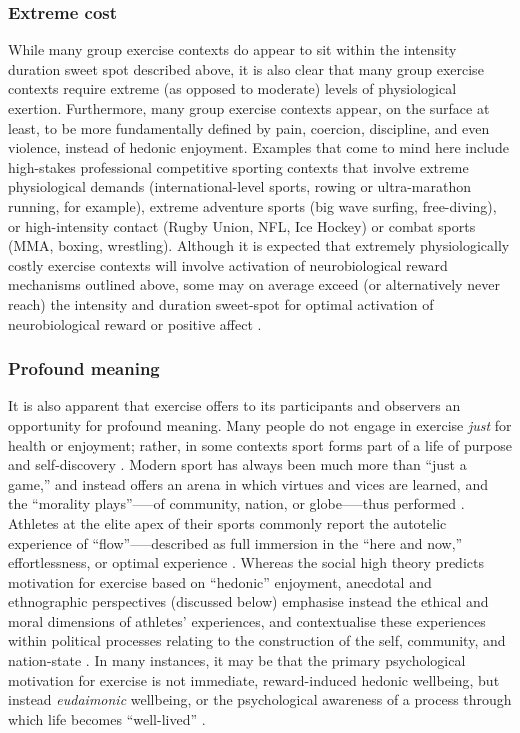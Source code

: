 \begin{CJK}{UTF8}{gbsn}
\subsubsection{Extreme cost}
While many group exercise contexts do appear to sit within the intensity duration sweet spot described above, it is also clear that many group exercise contexts require extreme (as opposed to moderate) levels of physiological exertion.  Furthermore, many group exercise contexts appear, on the surface at least, to be more fundamentally defined by pain, coercion, discipline, and even violence, instead of hedonic enjoyment.  Examples that come to mind here include high-stakes professional competitive sporting contexts that involve extreme physiological demands (international-level sports, rowing or ultra-marathon running, for example), extreme adventure sports (big wave surfing, free-diving), or high-intensity contact (Rugby Union, NFL, Ice Hockey) or combat  sports (MMA, boxing, wrestling).  Although it is expected that extremely physiologically costly exercise contexts will involve activation of neurobiological reward mechanisms outlined above, some may on average exceed (or alternatively never reach) the intensity and duration sweet-spot for optimal activation of neurobiological reward \citep{Raichlen2013} or positive affect \citep{Ekkekakis2011,Reed2006}.


\subsubsection{Profound meaning}
It is also apparent that exercise offers to its participants and observers an opportunity for profound meaning.  Many people do not engage in exercise \textit{just} for health or enjoyment; rather, in some contexts sport forms part of a life of purpose and self-discovery \citep[see, for example][]{Jackson1995,Jones2004,White2011}.  Modern sport has always been much more than ``just a game,'' and instead offers an arena in which virtues and vices are learned, and the ``morality plays''—--of community, nation, or globe—--thus performed \citep{Elias1986,McNamee2008}.  Athletes at the elite apex of their sports commonly report the autotelic experience of ``flow''--—described as full immersion in the ``here and now,'' effortlessness, or optimal experience \citep{Csikszentmihalyi1992,Dietrich2004}.  Whereas the social high theory predicts motivation for exercise based on ``hedonic'' enjoyment, anecdotal and ethnographic perspectives (discussed below) emphasise instead the ethical and moral dimensions of athletes’ experiences, and contextualise these experiences within political processes relating to the construction of the self, community, and nation-state \citep{Alter1993,Brownell1995, Downey2005b,Wacquant2004}.  In many instances, it may be that the primary psychological motivation for exercise is not immediate, reward-induced hedonic wellbeing, but instead \textit{eudaimonic} wellbeing, or the psychological awareness of a process through which life becomes ``well-lived'' \citep{Fave2009,Huta2013}.


\end{CJK}
